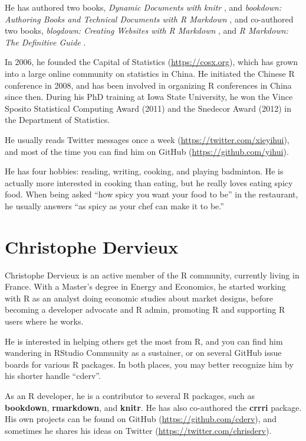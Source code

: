 \documentclass[
  11pt,
]{krantz}
\begin{document}
He has authored two books, \emph{Dynamic Documents with knitr} \citep{knitr2015}, and \emph{bookdown: Authoring Books and Technical Documents with R Markdown} \citep{bookdown2016}, and co-authored two books, \emph{blogdown: Creating Websites with R Markdown} \citep{blogdown2017}, and \emph{R Markdown: The Definitive Guide} \citep{rmarkdown2018}.

In 2006, he founded the Capital of Statistics (\url{https://cosx.org}), which has grown into a large online community on statistics in China. He initiated the Chinese R conference in 2008, and has been involved in organizing R conferences in China since then. During his PhD training at Iowa State University, he won the Vince Sposito Statistical Computing Award (2011) and the Snedecor Award (2012) in the Department of Statistics.

He usually reads Twitter messages once a week (\url{https://twitter.com/xieyihui}), and most of the time you can find him on GitHub (\url{https://github.com/yihui}).

He has four hobbies: reading, writing, cooking, and playing badminton. He is actually more interested in cooking than eating, but he really loves eating spicy food. When being asked ``how spicy you want your food to be'' in the restaurant, he usually answers ``as spicy as your chef can make it to be.''

\hypertarget{christophe-dervieux}{%
\section*{Christophe Dervieux}\label{christophe-dervieux}}


Christophe Dervieux is an active member of the R community, currently living in France. With a Master's degree in Energy and Economics, he started working with R as an analyst doing economic studies about market designs, before becoming a developer advocate and R admin, promoting R and supporting R users where he works.

He is interested in helping others get the most from R, and you can find him wandering in RStudio Community as a sustainer, or on several GitHub issue boards for various R packages. In both places, you may better recognize him by his shorter handle ``cderv''.

As an R developer, he is a contributor to several R packages, such as \textbf{bookdown}, \textbf{rmarkdown}, and \textbf{knitr}. He has also co-authored the \textbf{crrri} package. His own projects can be found on GitHub (\url{https://github.com/cderv}), and sometimes he shares his ideas on Twitter (\url{https://twitter.com/chrisderv}).
\end{document}
